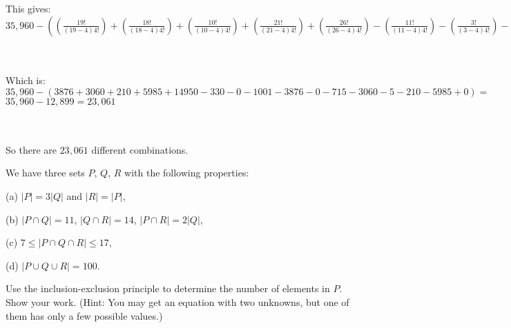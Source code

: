\documentclass{article}
\begin{document}
\begin{problem}
\begin{solution}
\\\\ This gives:
\\ $35,960 - ((\frac{19!}{(19-4)4!}) + (\frac{18!}{(18-4)4!}) + (\frac{10!}{(10-4)4!}) + (\frac{21!}{(21-4)4!}) + (\frac{26!}{(26-4)4!}) - (\frac{11!}{(11-4)4!}) - (\frac{3!}{(3-4)4!}) - (\frac{14!}{(14-4)4!}) - (\frac{19!}{(19-4)4!}) - (\frac{2!}{(2-4)4!}) - (\frac{13!}{(13-4)4!}) - (\frac{18!}{(18-4)4!}) - (\frac{5!}{(5-4)4!}) - (\frac{10!}{(10-4)4!}) - (\frac{21!}{(21-4)4!}) - (\frac{0!}{(0-4)4!}))$
\newline

\\\\ Which is:
\\ $35,960 - (3876 + 3060 + 210 + 5985 + 14950 - 330 - 0 - 1001 -3876 - 0 - 715 - 3060 - 5 - 210 - 5985 + 0) =$
\\ $35,960 - 12,899 = 23,061$
\newline

\\\\ So there are $23,061$ different combinations. 

\end{solution}



\bigskip
\begin{problem}
\noindent 
We have three sets $P$, $Q$, $R$
with the following properties:

\begin{description}

\item{(a)}  $|P| = 3|Q|$ and 
                $|R| = |P|$,

\item{(b)} $|P\cap Q| = 11$,
        $ |Q\cap R|  = 14$,
        $ |P\cap R| = 2|Q|$,

\item{(c)}
$7\le |P\cap Q\cap R| \le 17$,

\item{(d)}
$|P\cup Q\cup R| = 100$.

\end{description}

Use the inclusion-exclusion principle to
determine the number of elements in $P$.
Show your work.
(Hint: You may get an equation with two unknowns, but one of them has only a few possible values.)
\end{problem}


\end{problem}
\end{document}
